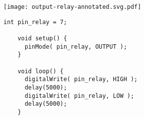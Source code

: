 \vspace{0.1in}
\begin{minipage}[t]{0.49\tw}
  \vspace{0.0in}
  \texttt{[image: output-relay-annotated.svg.pdf]}
\end{minipage}
\hspace{0.1in}
\begin{minipage}[t]{0.49\tw}
  \vspace{0.1in}
  \begin{Verbatim}[gobble=3,fontsize=\small]
    int pin_relay = 7;

    void setup() {
      pinMode( pin_relay, OUTPUT );
    }

    void loop() {
      digitalWrite( pin_relay, HIGH );
      delay(5000);
      digitalWrite( pin_relay, LOW );
      delay(5000);
    }
  \end{Verbatim}
\end{minipage}
\vspace{0.1in}

